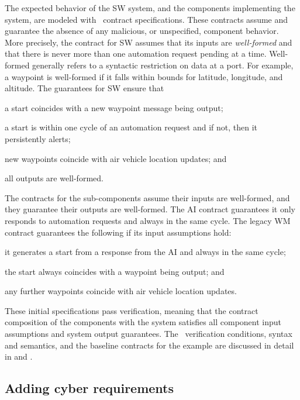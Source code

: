 
The expected behavior of the SW system, and the components
implementing the system, are modeled with \agr\ contract
specifications.  
These contracts assume and guarantee the absence
of any malicious, or unspecified, component behavior.  More precisely,
the contract for SW assumes that its inputs are \emph{well-formed} and that
there is never more than one automation request pending at a time.
Well-formed generally refers to a syntactic restriction on
data at a port. For example, a waypoint is well-formed if it falls
within bounds for latitude, longitude, and altitude.  The guarantees
for SW ensure that
\begin{compactitem}
\item a start coincides with a new waypoint message being output;
\item a start is within one cycle of an automation request and if not, then it persistently alerts;
\item new waypoints coincide with air vehicle location updates; and
\item all outputs are well-formed.
\end{compactitem}

The contracts for the sub-components assume their inputs are
well-formed, and they guarantee their outputs are well-formed.  The AI
contract guarantees it only responds to automation requests and always
in the same cycle.  The legacy WM contract guarantees the following if
its input assumptions hold:
\begin{compactitem}
  \item it generates a start from a response from the AI and always in the same cycle;
  \item the start always coincides with a waypoint being output; and
  \item any further waypoints coincide with air vehicle location updates.
\end{compactitem}
These initial specifications pass verification, meaning that the
contract composition of the components with the system satisfies all
component input assumptions and system output guarantees.
The \agr\ verification conditions, syntax and semantics, and the baseline contracts for the example are discussed in detail in  and .

\subsection{Adding cyber requirements}

